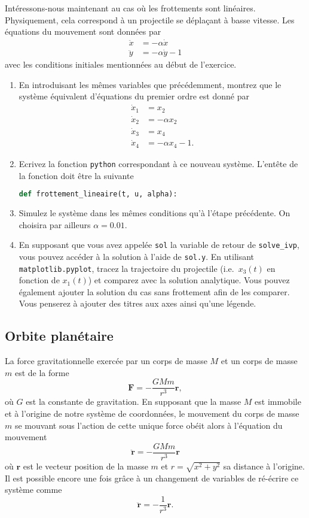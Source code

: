 \documentclass[a4paper,12pt]{article} %
\begin{document}
Intéressons-nous maintenant au cas où les frottements sont linéaires.
Physiquement, cela correspond à un projectile se déplaçant à basse vitesse.
Les équations du mouvement sont données par
%
\[
\begin{aligned}
  \ddot{x} & = -\alpha \dot{x} \\
  \ddot{y} & = -\alpha \dot{y} - 1
\end{aligned}
\]
%
avec les conditions initiales mentionnées au début de l'exercice.

\begin{enumerate}
\item En introduisant les mêmes variables que précédemment, montrez que le système équivalent d'équations du premier ordre est donné par
  \[
  \begin{aligned}
    \dot{x}_1 & = x_2 \\
    \dot{x}_2 & = -\alpha x_2 \\
    \dot{x}_3 & = x_4 \\
    \dot{x}_4 & = -\alpha x_4 - 1.
  \end{aligned}
  \]

\item Ecrivez la fonction \verb+python+ correspondant à ce nouveau système.
  L'entête de la fonction doit être la suivante
  \begin{lstlisting}[language=Python]
    def frottement_lineaire(t, u, alpha):
  \end{lstlisting}

\item Simulez le système dans les mêmes conditions qu'à l'étape précédente.
  On choisira par ailleurs $\alpha = 0.01$.

\item En supposant que vous avez appelée \verb+sol+ la variable de retour de \verb+solve_ivp+, vous pouvez accéder à la solution à l'aide de \verb+sol.y+.
  En utilisant \verb+matplotlib.pyplot+, tracez la trajectoire du projectile (i.e.\ $x_3(t)$ en fonction de $x_1(t)$) et comparez avec la solution analytique.
  Vous pouvez également ajouter la solution du cas sans frottement afin de les comparer.
  Vous penserez à ajouter des titres aux axes ainsi qu'une légende.
\end{enumerate}



\subsection*{Orbite planétaire}

La force gravitationnelle exercée par un corps de masse $M$ et un corps de masse $m$ est de la forme
%
\[
\bm{F} = -\dfrac{GMm}{r^3} \bm{r},
\]
%
où $G$ est la constante de gravitation.
En supposant que la masse $M$ est immobile et à l'origine de notre système de coordonnées, le mouvement du corps de masse $m$ se mouvant sous l'action de cette unique force obéit alors à l'équation du mouvement
%
\[
\ddot{\bm{r}} = -\dfrac{GMm}{r^3} \bm{r}
\]
%
où $\bm{r}$ est le vecteur position de la masse $m$ et $r = \sqrt{x^2 + y^2}$ sa distance à l'origine.
Il est possible encore une fois grâce à un changement de variables de ré-écrire ce système comme
%
\[
\ddot{\bm{r}} = -\dfrac{1}{r^3} \bm{r}.
\]
\end{document}
